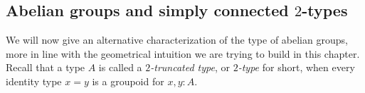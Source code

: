 \subsection{Abelian groups and simply connected $2$-types}
\label{sec:abel-groups-simply}

We will now give an alternative characterization of the type of
abelian groups, more in line with the geometrical intuition we are
trying to build in this chapter. Recall that a type $A$ is called a
{\em $2$-truncated type}, or {\em $2$-type} for short, when every
identity type $x=y$ is a groupoid for $x,y:A$.


